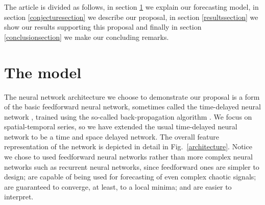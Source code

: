 \documentclass[journal]{IEEEtran}
\begin{document}
The article is divided as follows, in section \ref{modelsection} we explain our forecasting model, in section \ref{conjecturesection} 
we describe our proposal, in section \ref{resultssection} we show our results supporting this proposal and finally in section
\ref{conclusionsection} we make our concluding remarks.

\section{The model}
\label{modelsection}

The neural network architecture we choose to demonstrate our proposal is a form of the basic feedforward neural network,
sometimes called the time-delayed neural network \cite{Waibel:1990:PRU:108235.108263}, trained using the so-called back-propagation
algorithm \cite{10.1007/BFb0006203, 1986Natur.323..533R, 58337, Lecun98gradient-basedlearning}. 
We focus on spatial-temporal series, so we have extended the usual time-delayed neural network
to be a time and space delayed network. The overall feature representation of the network is depicted in detail in 
Fig.\ \ref{architecture}. Notice we chose to used feedforward neural networks rather than more complex neural networks such
as recurrent neural networks\cite{COGS:COGS203}, since
feedforward ones are simpler to design; are capable of being used for forecasting of even complex chaotic signals; are guaranteed
to converge, at least, to a local minima; and are easier to interpret.
\end{document}
